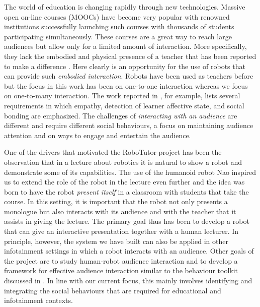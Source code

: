
The world of education is changing rapidly through new technologies. Massive open on-line courses (MOOCs) have become very popular with renowned institutions successfully launching such courses with thousands of students participating simultaneously. These courses are a great way to reach large audiences but allow only for a limited amount of interaction. More specifically, they lack the embodied and physical presence of a teacher that has been reported to make a difference \cite{Hoffmann2011}. Here clearly is an opportunity for the use of robots that can provide such \textit{embodied interaction}. Robots have been used as teachers before \cite{Castellano2013,Han2005,Saerbeck2010} but the focus in this work has been on one-to-one interaction whereas we focus on one-to-many interaction. The work reported in \cite{Castellano2013}, for example, lists several requirements in which empathy, detection of learner affective state, and social bonding are emphasized. The challenges of \textit{interacting with an audience} are different and require different social behaviours, a focus on maintaining audience attention and on ways to engage and entertain the audience.

One of the drivers that motivated the RoboTutor project has been the observation that in a lecture about robotics it is natural to show a robot and demonstrate some of its capabilities. The use of the humanoid robot Nao inspired us to extend the role of the robot in the lecture even further and the idea was born to have the robot \textit{present itself} in a classroom with students that take the course. In this setting, it is important that the robot not only presents a monologue but also interacts with its audience and with the teacher that it assists in giving the lecture. The primary goal thus has been to develop a robot that can give an interactive presentation together with a human lecturer. In principle, however, the system we have built can also be applied in other infotainment settings in which a robot interacts with an audience. Other goals of the project are to study human-robot audience interaction \cite{Knight2011,Mutlu2006} and to develop a framework for effective audience interaction similar to the behaviour toolkit discussed in \cite{Huang2012}. In line with our current focus, this mainly involves identifying and integrating the social behaviours that are required for educational and infotainment contexts.

